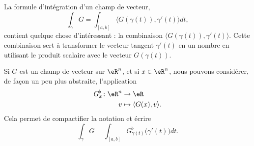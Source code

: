 La formule d'intégration d'un champ de vecteur,
\begin{equation}
	\int_{\gamma}G=\int_{[a,b]}\langle G (\gamma(t)), \gamma'(t)\rangle dt,
\end{equation}
contient quelque chose d'intéressant : la combinaison $\langle G( \gamma(t) ), \gamma'(t)\rangle$. Cette combinaison sert à transformer le vecteur tangent $\gamma'(t)$ en un nombre en utilisant le produit scalaire avec le vecteur $G( \gamma(t) )$.

Si $G$ est un champ de vecteur sur $\eR^n$, et si $x\in\eR^n$, nous pouvons considérer, de façon un peu plus abstraite, l'application
\begin{equation}		\label{EqDefBemol}
	\begin{aligned}[]
		G^{\flat}_x\colon \eR^n&\to \eR \\
			v&\mapsto \langle G(x), v\rangle . 
	\end{aligned}
\end{equation}
Cela permet de compactifier la notation et écrire
\begin{equation}
	\int_{\gamma}G=\int_{[a,b]} G^{\flat}_{\gamma(t)}\big( \gamma'(t)\big) dt.
\end{equation}

